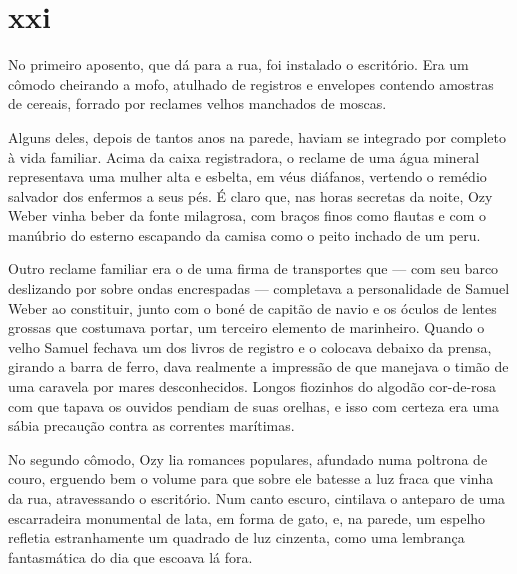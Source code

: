 

\section{xxi} 


No primeiro aposento, que dá para a rua, foi instalado o escritório. Era um
cômodo cheirando a mofo, atulhado de registros e envelopes contendo amostras
de cereais, forrado por reclames velhos manchados de moscas.

Alguns deles, depois de tantos anos na parede, haviam se integrado por
completo à vida familiar. Acima da caixa registradora, o reclame de uma água
mineral representava uma mulher alta e esbelta, em véus diáfanos, vertendo o
remédio salvador dos enfermos a seus pés. É claro que, nas horas secretas da
noite, Ozy Weber vinha beber da fonte milagrosa, com braços finos como
flautas e com o manúbrio do esterno escapando da camisa como o peito inchado
de um peru.

Outro reclame familiar era o de uma firma de transportes que --- com seu barco
deslizando por sobre ondas encrespadas --- completava a personalidade de
Samuel Weber ao constituir, junto com o boné de capitão de navio e os óculos
de lentes grossas que costumava portar, um terceiro elemento de marinheiro.
Quando o velho Samuel fechava um dos livros de registro e o colocava debaixo
da prensa, girando a barra de ferro, dava realmente a impressão de que
manejava o timão de uma caravela por mares desconhecidos. Longos fiozinhos do
algodão cor-de-rosa com que tapava os ouvidos pendiam de suas orelhas, e isso
com certeza era uma sábia precaução contra as correntes marítimas.

No segundo cômodo, Ozy lia romances populares, afundado numa poltrona de
couro, erguendo bem o volume para que sobre ele batesse a luz fraca que vinha
da rua, atravessando o escritório. Num canto escuro, cintilava o anteparo de
uma escarradeira monumental de lata, em forma de gato, e, na parede, um
espelho refletia estranhamente um quadrado de luz cinzenta, como uma
lembrança fantasmática do dia que escoava lá fora.

